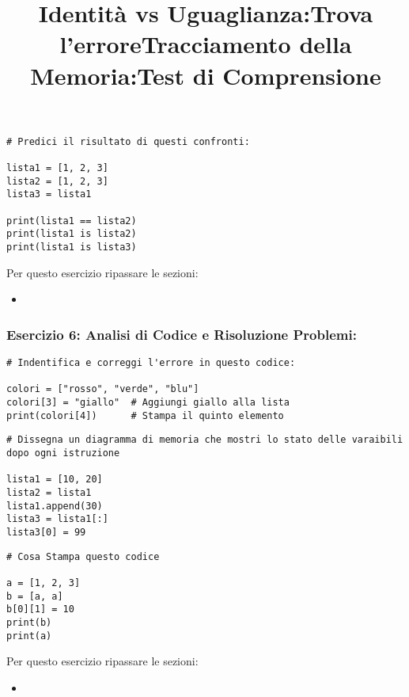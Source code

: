 \title{\textbf{Identità vs Uguaglianza:}}
\begin{lstlisting}
# Predici il risultato di questi confronti:

lista1 = [1, 2, 3]
lista2 = [1, 2, 3]
lista3 = lista1

print(lista1 == lista2)
print(lista1 is lista2)
print(lista1 is lista3)

\end{lstlisting}



Per questo esercizio ripassare le sezioni:
\begin{itemize}
    \item {}
\end{itemize}

\subsubsection{Esercizio 6: Analisi di Codice e Risoluzione Problemi:}\label{Esercizio6Liste}
\title{\textbf{Trova l'errore}}


\begin{lstlisting}
# Indentifica e correggi l'errore in questo codice:

colori = ["rosso", "verde", "blu"]
colori[3] = "giallo"  # Aggiungi giallo alla lista
print(colori[4])      # Stampa il quinto elemento

\end{lstlisting}


\title{\textbf{Tracciamento della Memoria:}}
\begin{lstlisting}
# Dissegna un diagramma di memoria che mostri lo stato delle varaibili dopo ogni istruzione

lista1 = [10, 20]
lista2 = lista1
lista1.append(30)
lista3 = lista1[:]
lista3[0] = 99

\end{lstlisting}


\title{\textbf{Test di Comprensione}}
\begin{lstlisting}
# Cosa Stampa questo codice

a = [1, 2, 3]
b = [a, a]
b[0][1] = 10
print(b)
print(a)

\end{lstlisting}



Per questo esercizio ripassare le sezioni:
\begin{itemize}
    \item {}
\end{itemize}


